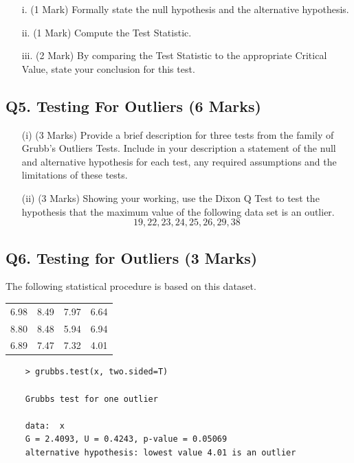 \documentclass[a4paper,12pt]{article}
\begin{document}
\begin{itemize}
\item[i.] (1 Mark) Formally state the null hypothesis and the alternative hypothesis.
\item[ii.] (1 Mark) Compute the Test Statistic.
\item[iii.] (2 Mark) By comparing the Test Statistic to the appropriate Critical Value, state your conclusion for this test.
\end{itemize}


\subsection*{Q5. Testing For Outliers (6 Marks)}
\begin{itemize}
	\item[(i)] (3 Marks) Provide a brief description for three tests from the family of Grubb's  Outliers Tests. Include in your description a statement of the null and alternative hypothesis for each test, any required assumptions and the limitations of these tests.
	\item[(ii)] (3 Marks) Showing your working, use the Dixon Q Test to test the hypothesis that the maximum value of the following data set is an outlier.
	\[ 19,22,23,24,25,26,29,38\]
\end{itemize}

\newpage
\subsection*{Q6. Testing for Outliers (3 Marks)} %
The following statistical procedure is based on this dataset.
\begin{center}
\begin{tabular}{|cccc|}
	\hline
	6.98 &8.49 &7.97& 6.64\\
	8.80 &8.48 &5.94& 6.94\\
	6.89 &7.47 &7.32& 4.01\\
	\hline
\end{tabular}
\end{center}

\begin{framed}

	\begin{verbatim}
	> grubbs.test(x, two.sided=T)
	
	Grubbs test for one outlier
	
	data:  x
	G = 2.4093, U = 0.4243, p-value = 0.05069
	alternative hypothesis: lowest value 4.01 is an outlier
	\end{verbatim}
\end{framed}
\end{document}
